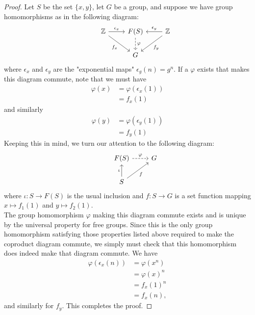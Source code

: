 \documentclass[12pt]{article}
\begin{document}
\begin{proof}
  Let $S$ be the set $\{x,y\}$, let $G$ be a group,
  and suppose we have group homomorphisms as in the following diagram:
  \[ \begin{tikzcd}
    & \mathbb{Z} 
    \ar{r}{\epsilon_x} 
    \ar{dr}[swap]{f_x}
    & F(S)
    \ar[dashed]{d}{\varphi}
    & \mathbb{Z}
    \ar{l}[swap]{\epsilon_y}
    \ar{dl}{f_y}
    \\
    & & G &
  \end{tikzcd} \]
  where $\epsilon_x$ and $\epsilon_y$ are the "exponential maps" $\epsilon_g(n) = g^n$.
  If a $\varphi$ exists that makes this diagram commute, note that we must have
  \begin{align*}
    \varphi(x) &= \varphi(\epsilon_x(1)) \\
    &= f_x(1)
  \end{align*}
  and similarly
  \begin{align*}
    \varphi(y) &= \varphi(\epsilon_y(1)) \\
    &= f_y(1)
  \end{align*}
  Keeping this in mind, we turn our attention to the following diagram:
  \[\begin{tikzcd}
      & F(S) \ar[dashed]{r}{\varphi} & G \\
      & S \ar{u}{\iota} \ar{ur}[swap]{f} &
  \end{tikzcd}\]
  where $\iota:S\to F(S)$ is the usual inclusion and $f:S\to G$ is a set function mapping
  $x\mapsto f_1(1)$ and $y\mapsto f_2(1)$.\\
  The group homomorphism $\varphi$ making this diagram commute exists and is unique by the 
  universal property for free groups.
  Since this is the only group homomorphism satisfying those properties listed above required to 
  make the coproduct diagram commute, we simply must check that this homomorphism does indeed
  make that diagram commute.
  We have
  \begin{align*}
    \varphi(\epsilon_x(n)) &= \varphi(x^n) \\
    &= \varphi(x)^n \\
    &= f_x(1)^n \\
    &= f_x(n),
  \end{align*}
  and similarly for $f_y$. This completes the proof.
\end{proof}
\end{document}
